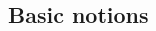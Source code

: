 \documentclass[11pt, fleqn, a4paper, landscape]{article}
\theoremstyle{plain} %
\theoremstyle{remark} %
\theoremstyle{definition} %
\newtheorem{defi}[thm]{Def}
\begin{document}
\setlength{\abovedisplayskip}{0pt}
\setlength{\belowdisplayskip}{0pt}
\setlength{\abovedisplayshortskip}{0pt}
\setlength{\belowdisplayshortskip}{0pt}

\begin{multicols}{5}

\section{Basic notions}
\addtocounter{subsection}{1} 
\addtocounter{thm}{1}
\addtocounter{thm}{1}
\addtocounter{thm}{1}
\addtocounter{thm}{1}


\end{multicols}
\end{document}
